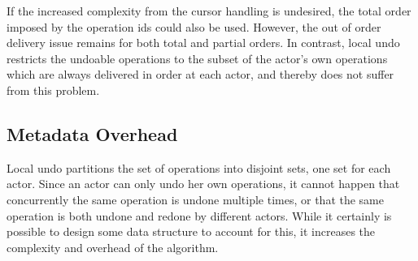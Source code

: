 \documentclass[sigplan,natbib=false,review]{acmart}
\begin{document}
If the increased complexity from the cursor handling is undesired,
the total order imposed by the operation ids could also be used.
However, the out of order delivery issue remains for both total and
partial orders.
In contrast, local undo restricts the undoable operations to the subset of
the actor's own operations which are always delivered in order at each actor,
and thereby does not suffer from this problem.

\subsection{Metadata Overhead}

Local undo partitions the set of operations into disjoint sets,
one set for each actor.
Since an actor can only undo her own operations,
it cannot happen that concurrently the same operation is undone multiple times,
or that the same operation is both undone and redone by different actors.
While it certainly is possible to design some data structure to account for this,
it increases the complexity and overhead of the algorithm.
\end{document}
